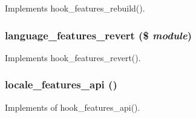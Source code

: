 \label{features_8locale_8inc_a16d6aa7d5802ae4863d732698b776e1f}
Implements hook\_\-features\_\-rebuild(). \hypertarget{features_8locale_8inc_a103f8aaefec6c5034ca55431cae83336}{
\subsubsection[{language\_\-features\_\-revert}]{\setlength{\rightskip}{0pt plus 5cm}language\_\-features\_\-revert (\$ {\em module})}}
\label{features_8locale_8inc_a103f8aaefec6c5034ca55431cae83336}
Implements hook\_\-features\_\-revert(). \hypertarget{features_8locale_8inc_a4436c1b5cde316e9831ccc36d24505cb}{
\subsubsection[{locale\_\-features\_\-api}]{\setlength{\rightskip}{0pt plus 5cm}locale\_\-features\_\-api ()}}
\label{features_8locale_8inc_a4436c1b5cde316e9831ccc36d24505cb}
Implements of hook\_\-features\_\-api(). 